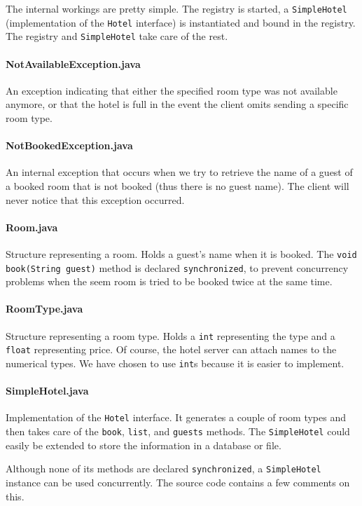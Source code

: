 \documentclass[a4paper,10pt]{article}
\begin{document}
The internal workings are pretty simple. The registry is started, a
\texttt{SimpleHotel} (implementation of the \texttt{Hotel} interface) is instantiated
and bound in the registry. The registry and \texttt{SimpleHotel} take care of
the rest.

\paragraph{NotAvailableException.java}
An exception indicating that either the specified room type was not
available anymore, or that the hotel is full in the event the client
omits sending a specific room type.

\paragraph{NotBookedException.java}
An internal exception that occurs when we try to retrieve the name of a guest of a booked room that is not booked (thus there is no guest name). The client will never notice that this exception occurred.

\paragraph{Room.java}
Structure representing a room. Holds a guest's name when it is
booked. The \texttt{void book(String guest)} method is declared
\texttt{synchronized}, to prevent concurrency problems when the seem
room is tried to be booked twice at the same time.

\paragraph{RoomType.java}
Structure representing a room type. Holds a \texttt{int} representing the type
and a \texttt{float} representing price. Of course, the hotel server can attach
names to the numerical types. We have chosen to use \texttt{int}s because it is
easier to implement.

\paragraph{SimpleHotel.java}
Implementation of the \texttt{Hotel} interface. It generates a couple of room
types and then takes care of the \texttt{book}, \texttt{list}, and \texttt{guests} methods. The
\texttt{SimpleHotel} could easily be extended to store the information in a
database or file.

Although none of its methods are declared \texttt{synchronized}, a
\texttt{SimpleHotel} instance can be used concurrently. The source
code contains a few comments on this.
\end{document}
